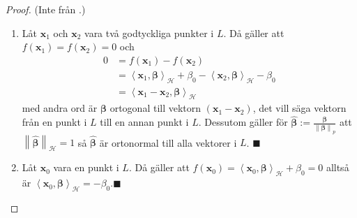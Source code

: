 \documentclass[a4paper, 12pt]{report}
\theoremstyle{definition}
\theoremstyle{remark}
\newcommand{\bfbeta}{{\boldsymbol{\beta}}}
\renewcommand\qedsymbol{$\blacksquare$}
\newcommand{\bfx}{\mathbf{x}}
\newcommand{\llangle}{\left\langle}
\newcommand{\rrangle}{\right\rangle}
\newcommand{\inner}[2]{\llangle #1, #2 \rrangle}
\newcommand{\hil}{\mathcal{H}}
\begin{document}
\begin{proof} (Inte från \cite{ESL}.)
	\leavevmode
\begin{enumerate}
	\item Låt $\mathbf{x}_1$ och $\mathbf{x}_2$ vara två godtyckliga punkter i $L$. Då gäller att $f\left(\mathbf{x}_1\right)=f\left(\mathbf{x}_2\right)=0$ och
	\begin{align*}
		0 &= f\left(\mathbf{x}_1\right)-f\left(\mathbf{x}_2\right)\\
		&= \inner{\bfx_1}{\bfbeta}_\hil + \beta_0 - \inner{\bfx_2}{\bfbeta}_\hil - \beta_0\\
		&= \inner{\mathbf{x}_1-\mathbf{x}_2}{\bfbeta}_\hil
	\end{align*}
	med andra ord är $\bfbeta$ ortogonal till vektorn $\left(\mathbf{x}_1-\mathbf{x}_2\right)$, det vill säga vektorn från en punkt i $L$ till en annan punkt i $L$.
	Dessutom gäller för $\widehat{\bfbeta}:=\frac{\bfbeta}{\left\|\bfbeta
	\right\|_p}$ att $\left\|\widehat{\bfbeta}\right\|_\hil=1$ så $\widehat{\bfbeta}$ är ortonormal till alla vektorer i $L$. \hfill\qedsymbol

	\item \label{eq:egenskap2}Låt $\mathbf{x}_0$ vara en punkt i $L$. Då gäller att $f\left(\mathbf{x}_0\right)=\inner{\bfx_0}{\bfbeta}_\hil + \beta_0 = 0$ alltså är $\inner{\bfx_0}{\bfbeta}_\hil = - \beta_0$.\hfill \qedsymbol
	

\end{enumerate}
\end{proof}
\end{document}
